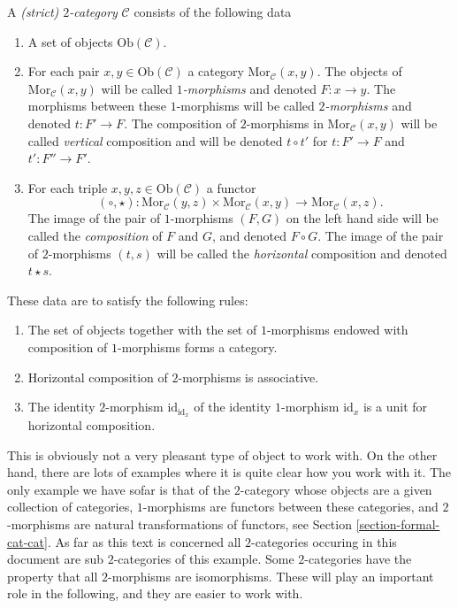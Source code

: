 \begin{definition}
\label{definition-2-category}
A {\it (strict) $2$-category} $\mathcal{C}$ consists of the following data
\begin{enumerate}
\item A set of objects $\text{Ob}(\mathcal{C})$.
\item For each pair $x,y \in \text{Ob}(\mathcal{C})$
a category $\text{Mor}_\mathcal{C}(x,y)$. The objects of
$\text{Mor}_\mathcal{C}(x,y)$ will be called {\it $1$-morphisms}
and denoted $F : x \to y$. The morphisms between these $1$-morphisms
will be called {\it $2$-morphisms} and denoted $t : F' \to F$.
The composition of $2$-morphisms in $\text{Mor}_\mathcal{C}(x,y)$
will be called {\it vertical} composition and will be
denoted $t \circ t'$ for $t : F' \to F$ and $t' : F'' \to F'$.
\item For each triple $x,y,z\in \text{Ob}(\mathcal{C})$ a
functor
$$
(\circ, \star) : 
\text{Mor}_\mathcal{C}(y,z) \times \text{Mor}_\mathcal{C}(x,y) 
\longrightarrow
\text{Mor}_\mathcal{C}(x,z).
$$
The image of the pair of $1$-morphisms $(F,G)$ on the left hand side
will be called the {\it composition} of $F$ and $G$, and denoted
$F\circ G$. The image of the pair of $2$-morphisms $(t,s)$ will
be called the {\it horizontal} composition and denoted $t \star s$.
\end{enumerate}
These data are to satisfy the following rules:
\begin{enumerate}
\item The set of objects together with the set of $1$-morphisms endowed
with composition of $1$-morphisms forms a category.
\item Horizontal composition of $2$-morphisms is associative.
\item The identity $2$-morphism $\text{id}_{\text{id}_x}$
of the identity $1$-morphism $\text{id}_x$ is a unit for
horizontal composition.
\end{enumerate}
\end{definition}

\noindent
This is obviously not a very pleasant type of object to work with.
On the other hand, there are lots of examples where it is quite clear
how you work with it. The only example we have sofar is that of
the $2$-category whose objects are a given collection of categories,
$1$-morphisms are functors between these categories,
and $2$-morphisms are natural transformations of functors, see
Section \ref{section-formal-cat-cat}.
As far as this text is concerned
all $2$-categories occuring in this document are sub $2$-categories
of this example. Some $2$-categories have the property that all $2$-morphisms
are isomorphisms. These will play an important role in the following,
and they are easier to work with.

